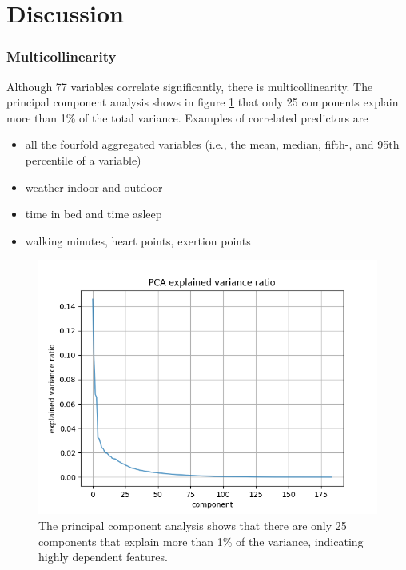\documentclass[conference]{IEEEtran}
\begin{document}

\section{Discussion}

\subsubsection{Multicollinearity}
Although 77 variables correlate significantly, there is multicollinearity. The principal component analysis shows in figure \ref{fig:pca} that only 25 components explain more than 1\% of the total variance. Examples of correlated predictors are
\begin{itemize}
    \item all the fourfold aggregated variables (i.e., the mean, median, fifth-, and 95th percentile of a variable)
    \item weather indoor and outdoor
    \item time in bed and time asleep
    \item walking minutes, heart points, exertion points
\end{itemize}

\begin{figure}[htbp]
\begin{center}
\includegraphics[width=1\linewidth]{figs/pca_explained_variance_ratio.png}
\caption{The principal component analysis shows that there are only 25 components that explain more than 1\% of the variance, indicating highly dependent features.}
\label{fig:pca}
\end{center}
\end{figure}
\end{document}
